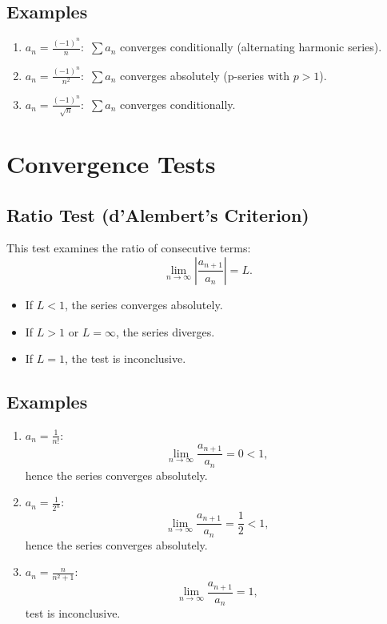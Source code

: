 \documentclass[a4paper, 12pt]{article}
\begin{document}
\subsection*{Examples}
\begin{enumerate}
    \item \(a_n = \frac{(-1)^n}{n}\):\
    \(\sum a_n\) converges conditionally (alternating harmonic series).

    \item \(a_n = \frac{(-1)^n}{n^2}\):\
    \(\sum a_n\) converges absolutely (p-series with \(p > 1\)).

    \item \(a_n = \frac{(-1)^n}{\sqrt{n}}\):\
    \(\sum a_n\) converges conditionally.
\end{enumerate}

\section{Convergence Tests}

\subsection{Ratio Test (d'Alembert's Criterion)}
This test examines the ratio of consecutive terms:
\[\lim_{n \to \infty} \left|\frac{a_{n+1}}{a_n}\right| = L.\]
\begin{itemize}
    \item If \(L < 1\), the series converges absolutely.
    \item If \(L > 1\) or \(L = \infty\), the series diverges.
    \item If \(L = 1\), the test is inconclusive.
\end{itemize}

\subsection*{Examples}
\begin{enumerate}
    \item \(a_n = \frac{1}{n!}\):
    \[\lim_{n \to \infty} \frac{a_{n+1}}{a_n} = 0 < 1,\]
    hence the series converges absolutely.

    \item \(a_n = \frac{1}{2^n}\):
    \[\lim_{n \to \infty} \frac{a_{n+1}}{a_n} = \frac{1}{2} < 1,\]
    hence the series converges absolutely.

    \item \(a_n = \frac{n}{n^2 + 1}\):
    \[\lim_{n \to \infty} \frac{a_{n+1}}{a_n} = 1,\]
    test is inconclusive.
\end{enumerate}
\end{document}
